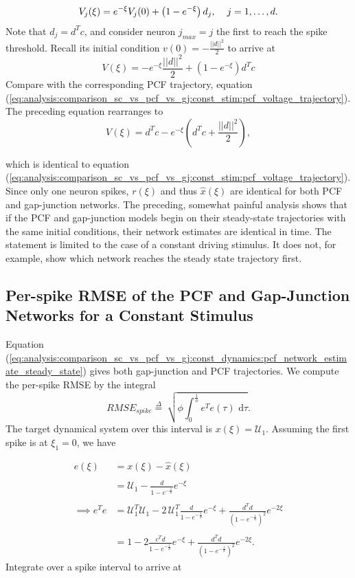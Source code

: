 $$
	V_j(\xi)
	=
	 e^{-\xi} V_j(0)
	+
	\left(
		1 - e^{-\xi}
	\right)
	d_j , \hspace{4mm} j = 1, \ldots, d.
$$
Note that $d_j = d^T c$, and consider neuron $j_{max} = j$ the first to reach the spike threshold. Recall its initial condition $v(0) = -\frac{||d||^2}{2}$ to arrive at
$$
	V(\xi)
	=
	 - e^{-\xi} \frac{||d||^2}{2}
	+
	\left(
		1 - e^{-\xi}
	\right)
	d^T c
$$
Compare with the corresponding PCF trajectory, equation (\ref{eq:analysis:comparison_sc_vs_pcf_vs_gj:const_stim:pcf_voltage_trajectory}). The preceding equation rearranges to
$$
	V(\xi) = 
	d^T c 
	- e^{-\xi}
	\left(
		d^T c  + \frac{||d||^2}{2}
	\right),
$$

which is identical to equation (\ref{eq:analysis:comparison_sc_vs_pcf_vs_gj:const_stim:pcf_voltage_trajectory}). Since only one neuron spikes, $r(\xi)$ and thus $\hat{x}(\xi)$ are identical for both PCF and gap-junction networks. 
The preceding, somewhat painful analysis shows that if the PCF and gap-junction models begin on their steady-state trajectories with the same initial conditions, their network estimates are identical in time. The statement is limited to the case of a constant driving stimulus. It does not, for example, show which network reaches the steady state trajectory first.



\subsection{Per-spike RMSE of the PCF and Gap-Junction Networks for a Constant Stimulus}

Equation (\ref{eq:analysis:comparison_sc_vs_pcf_vs_gj:const_dynamics:pcf_network_estimate_steady_state}) gives both gap-junction and PCF trajectories. We compute the per-spike RMSE by the integral 
$$
RMSE_{spike} \overset{\Delta}{=}\
\sqrt
{
	\phi \int_
	{	
		0
	}
	^
	{
		\frac
		{
			1
		}
		{
			\phi
		}
	}
	 \!  e^T e(\tau)\, \, \mathrm{d} \tau
}.
$$
The target dynamical system over this interval is $x(\xi) = \mathcal{U}_1$. Assuming the first spike is at $\xi_1 = 0$, we have 

\begin{align*}
e(\xi) 
&=
x(\xi) - \hat{x}(\xi)
\\
\\
&=
\mathcal{U}_1 
- 
\frac
{
	d
}
{
	1 - e^{-\frac{1}{\phi}}
}
e^{-\xi}
\\
\\
\implies
e^T e &= 
\mathcal{U}_1^T \mathcal{U}_1 
- 2 \, 
\mathcal{U}_1^T \frac
{
	d
}
{
	1 - e^{-\frac{1}{\phi}}
}
e^{-\xi}
+ 
\frac
{
	d^T d
}
{
	\left(1 - e^{-\frac{1}{\phi}}\right)^2
}
e^{- 2 \xi}
\\
\\
&= 
1 - 2 \frac{ c^T d } {1 - e^{-\frac{1}{\phi}}} e^{-\xi}
+ 
\frac
{
	d^T d
}
{
	\left(1 - e^{-\frac{1}{\phi}}\right)^2
}
e^{- 2 \xi}. 
\end{align*}
Integrate over a spike interval to arrive at 

